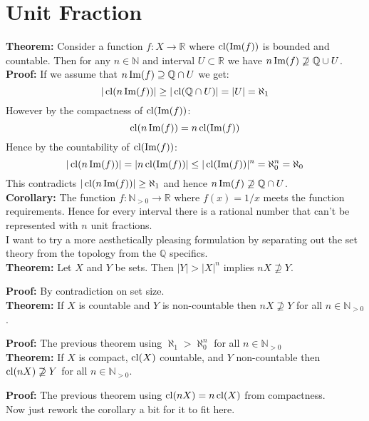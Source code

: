 \section{Unit Fraction}
\textbf{Theorem:}
Consider a function $f:X \rightarrow \mathbb{R}$ where $\operatorname{cl}(\operatorname{Im}(f))$ is bounded and countable.
Then for any $n\in\mathbb{N}$ and interval $U\subset \mathbb{R}$ we have $n\operatorname{Im}(f) \not\supseteq\mathbb{Q} \cup U$.
\\

\textbf{Proof:}
If we assume that $n\operatorname{Im}(f) \supseteq \mathbb{Q} \cap U$ we get:
\[|\operatorname{cl}(n\operatorname{Im}(f))| \geq |\operatorname{cl}(\mathbb{Q} \cap U)| = |U| = \aleph_1 \]
However by the compactness of $\operatorname{cl}(\operatorname{Im}(f))$:
\[\operatorname{cl}(n\operatorname{Im}(f))= n\operatorname{cl}(\operatorname{Im}(f))\]
Hence by the countability of $\operatorname{cl}(\operatorname{Im}(f))$:
\[|\operatorname{cl}(n\operatorname{Im}(f))| = |n \operatorname{cl}(\operatorname{Im}(f))| \leq |\operatorname{cl}(\operatorname{Im}(f))|^n = \aleph_0^n = \aleph_0\]
This contradicts $|\operatorname{cl}(n\operatorname{Im}(f))| \geq \aleph_1$ and hence $n\operatorname{Im}(f) \not\supseteq\mathbb{Q} \cap U$.
\\

\textbf{Corollary:}
The function $f:\mathbb{N}_{>0} \rightarrow \mathbb{R}$ where $f(x) = 1/x$ meets the function requirements.
Hence for every interval there is a rational number that can't be represented with $n$ unit fractions.
\\

I want to try a more aesthetically pleasing formulation by separating out the set theory from the topology from the $\mathbb{Q}$ specifics. 
\\

\textbf{Theorem:} Let $X$ and $Y$ be sets. 
Then $|Y| > |X|^n$ implies $nX \not\supseteq Y$.

\textbf{Proof:} By contradiction on set size.
\\

\textbf{Theorem:} If $X$ is countable and $Y$ is non-countable then $nX \not\supseteq Y$ for all $n\in\mathbb{N}_{>0}$.

\textbf{Proof:} The previous theorem using $\aleph_1 > \aleph_0^n$ for all $n\in\mathbb{N}_{>0}$
\\

\textbf{Theorem:} If $X$ is compact, $\operatorname{cl}(X)$ countable, and $Y$ non-countable then $\operatorname{cl}(nX) \not\supseteq Y$ for all $n\in\mathbb{N}_{>0}$.

\textbf{Proof:} The previous theorem using $\operatorname{cl}(nX) = n\operatorname{cl}(X)$ from compactness.
\\

Now just rework the corollary a bit for it to fit here. 
